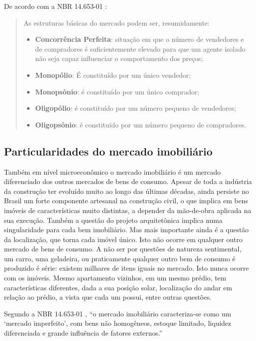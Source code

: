 \documentclass[
	12pt,				%
	oneside,			%
	a4paper,			%
	chapter=TITLE,		%
	section=TITLE,		%
	english,			%
	brazil				%
	]{abntex2}
\begin{document}
De acordo com a NBR 14.653-01 \autocite*[ix]{NBR1465301}:
\begin{quote}
As estruturas básicas do mercado podem ser, resumidamente:
\begin{itemize}
\item
  \textbf{Concorrência Perfeita}: situação em que o número de vendedores
  e de compradores é suficientemente elevado para que um agente isolado
  não seja capaz influenciar o comportamento dos preços;
\item
  \textbf{Monopólio}: É constituído por um único vendedor;
\item
  \textbf{Monopsônio}: é constituído por um único comprador;
\item
  \textbf{Oligopólio}: é constituído por um número pequeno de
  vendedores;
\item
  \textbf{Oligopsônio}: é constituído por um número pequeno de
  compradores.
\end{itemize}
\end{quote}
\subsection{Particularidades do mercado
imobiliário}\label{particularidades-do-mercado-imobiliuxe1rio}

Também em nível microeconômico o mercado imobiliário é um mercado
diferenciado dos outros mercados de bens de consumo. Apesar de toda a
indústria da construção ter evoluído muito ao longo das últimas décadas,
ainda persiste no Brasil um forte componente artesanal na construção
civil, o que implica em bens imóveis de características muito distintas,
a depender da mão-de-obra aplicada na sua execução. Também a questão do
projeto arquitetônica implica numa singularidade para cada bem
imobiliário. Mas mais importante ainda é a questão da localização, que
torna cada imóvel único. Isto não ocorre em qualquer outro mercado de
bens de consumo. A não ser por questões de natureza sentimental, um
carro, uma geladeira, ou praticamente qualquer outro bem de consumo é
produzido é série: existem milhares de itens iguais no mercado. Isto
nunca ocorre com os imóveis. Mesmo apartamento vizinhos, em um mesmo
prédio, tem características diferentes, dada a sua posição solar,
localização do andar em relação ao prédio, a vista que cada um possui,
entre outras questões.

Segundo a NBR 14.653-01 \autocite*[x]{NBR1465301}, ``o mercado
imobiliário caracteriza-se como um `mercado imperfeito', com bens não
homogêneos, estoque limitado, liquidez diferenciada e grande influência
de fatores externos.''
\end{document}
